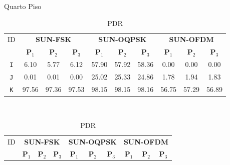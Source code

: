 \begin{table}
      \caption{Quarto Piso}
      \begin{subtable}{\textwidth}
            \begin{center}
                  \begin{tabular}{|c|c|c|c|c|c|c|c|c|c|}
                        \hline
                        ID         & \multicolumn{3}{c|}{\textbf{SUN-FSK}} & \multicolumn{3}{c|}{\textbf{SUN-OQPSK}} & \multicolumn{3}{c|}{\textbf{SUN-OFDM}}                                                                                                       \\ \cline{2-10}
                                   & \textbf{P$_1$}                        & \textbf{P$_2$}                          & \textbf{P$_3$}                         & \textbf{P$_1$} & \textbf{P$_2$} & \textbf{P$_3$} & \textbf{P$_1$} & \textbf{P$_2$} & \textbf{P$_3$} \\ \hline

                        \texttt{I} & 6.10                                  & 5.77                                    & 6.12                                   & 57.90          & 57.92          & 58.36          & 0.00           & 0.00           & 0.00           \\ \hline
                        \texttt{J} & 0.01                                  & 0.01                                    & 0.00                                   & 25.02          & 25.33          & 24.86          & 1.78           & 1.94           & 1.83           \\ \hline
                        \texttt{K} & 97.56                                 & 97.36                                   & 97.53                                  & 98.15          & 98.15          & 98.16          & 56.75          & 57.29          & 56.89          \\ \hline
                  \end{tabular}
                  \caption{PDR}
                  \label{table:pdr4}
            \end{center}
      \end{subtable}%
      \\
      \par\bigskip
      \begin{subtable}{\textwidth}
            \begin{center}
                  \begin{tabular}{|c|c|c|c|c|c|c|c|c|c|}
                        \hline
                        ID         & \multicolumn{3}{c|}{\textbf{SUN-FSK}} & \multicolumn{3}{c|}{\textbf{SUN-OQPSK}} & \multicolumn{3}{c|}{\textbf{SUN-OFDM}}                                                                                                       \\ \cline{2-10}
                                   & \textbf{P$_1$}                        & \textbf{P$_2$}                          & \textbf{P$_3$}                         & \textbf{P$_1$} & \textbf{P$_2$} & \textbf{P$_3$} & \textbf{P$_1$} & \textbf{P$_2$} & \textbf{P$_3$} \\ \hline


\end{tabular}
\end{center}
\end{subtable}
\end{table}
